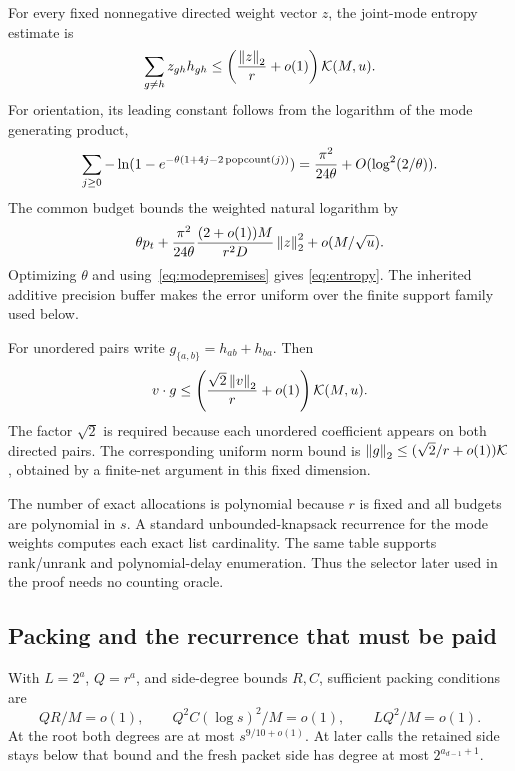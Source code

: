 For every fixed nonnegative directed weight vector $z$, the joint-mode
entropy estimate is
\begin{equation}\label{eq:entropy}
 \sum_{g\ne h}z_{gh}h_{gh}
 \le\left(\frac{\left\lVert z\right\rVert_2}{r}+o(1)\right)\mathcal K(M,u).
\end{equation}
For orientation, its leading constant follows from the logarithm of the
mode generating product,
\[
 \sum_{j\ge0}-\ln(1-e^{-\theta(1+4j-2\operatorname{popcount}(j))})
 =\frac{\pi^2}{24\theta}+O(\log^2(2/\theta)).
\]
The common budget bounds the weighted natural logarithm by
\[
 \theta p_t+\frac{\pi^2}{24\theta}
              \frac{(2+o(1))M}{r^2D}\left\lVert z\right\rVert_2^2
       +o(M/\sqrt u).
\]
Optimizing $\theta$ and using~\eqref{eq:modepremises} gives
\eqref{eq:entropy}. The inherited additive precision buffer makes the
error uniform over the finite support family used below.

For unordered pairs write $g_{\{a,b\}}=h_{ab}+h_{ba}$. Then
\begin{equation}\label{eq:unordered}
 v\cdot g\le
 \left(\frac{\sqrt2\left\lVert v\right\rVert_2}{r}+o(1)\right)\mathcal K(M,u).
\end{equation}
The factor $\sqrt2$ is required because each unordered coefficient
appears on both directed pairs. The corresponding uniform norm bound is
$\left\lVert g\right\rVert_2\le(\sqrt2/r+o(1))\mathcal K$, obtained by a finite-net argument
in this fixed dimension.

The number of exact allocations is polynomial because $r$ is fixed and
all budgets are polynomial in $s$. A standard unbounded-knapsack
recurrence for the mode weights computes each exact list cardinality.
The same table supports rank/unrank and polynomial-delay enumeration.
Thus the selector later used in the proof needs no counting oracle.

\subsection{Packing and the recurrence that must be paid}

With $L=2^a$, $Q=r^a$, and side-degree bounds $R,C$, sufficient packing
conditions are
\begin{equation}\label{eq:packing}
 QR/M=o(1),\qquad
 Q^2C(\log s)^2/M=o(1),\qquad
 LQ^2/M=o(1).
\end{equation}
At the root both degrees are at most $s^{9/10+o(1)}$. At later calls the
retained side stays below that bound and the fresh packet side has degree
at most $2^{a_{d-1}+1}$.

